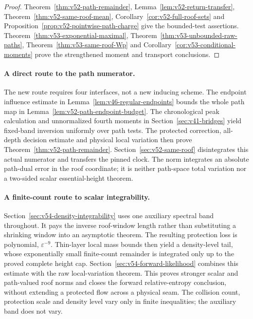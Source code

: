 \documentclass[11pt,reqno]{amsart}
\numberwithin{equation}{section}
\theoremstyle{definition}\newtheorem{definition}[theorem]{Definition}
\theoremstyle{remark}\newtheorem{remark}[theorem]{Remark}
\begin{document}
\begin{proof}
Theorem~\ref{thm:v52-path-remainder}, Lemma~\ref{lem:v52-return-transfer},
Theorem~\ref{thm:v52-same-roof-mean},
Corollary~\ref{cor:v52-full-roof-sets} and
Proposition~\ref{prop:v52-pointwise-path-charge} give the bounded-test
assertions. Theorem~\ref{thm:v53-exponential-maximal},
Theorem~\ref{thm:v53-unbounded-raw-paths},
Theorem~\ref{thm:v53-same-roof-Wp} and
Corollary~\ref{cor:v53-conditional-moments} prove the strengthened
moment and transport conclusions.
\end{proof}

\paragraph{A direct route to the path numerator.}
The new route requires four interfaces, not a new inducing scheme.
The endpoint influence estimate in
Lemma~\ref{lem:v46-regular-endpoints} bounds the whole path map in
Lemma~\ref{lem:v52-path-endpoint-budget}. The chronological peak
calculation and unnormalized fourth moments in
Section~\ref{sec:v41-bridges} yield fixed-band inversion uniformly over
path tests. The protected correction, all-depth decision estimate and
physical local variation then prove
Theorem~\ref{thm:v52-path-remainder}. Section~\ref{sec:v52-same-roof}
disintegrates this actual numerator and transfers the pinned clock.
The norm integrates an absolute path-dual error in the roof coordinate;
it is neither path-space total variation nor a two-sided scalar
essential-height theorem.

\paragraph{A finite-count route to scalar integrability.}
Section~\ref{sec:v54-density-integrability} uses one auxiliary spectral
band throughout. It pays the inverse roof-window length rather than
substituting a shrinking window into an asymptotic theorem. The
resulting protection loss is polynomial, $\varepsilon^{-9}$. Thin-layer
local mass bounds then yield a density-level tail, whose exponentially
small finite-count remainder is integrated only up to the proved
complete height cap. Section~\ref{sec:v54-forward-likelihood} combines
this estimate with the raw local-variation theorem. This proves stronger
scalar and path-valued roof norms and closes the forward relative-entropy
conclusion, without extending a protected flow across a physical seam.
The collision count, protection scale and density level vary only in
finite inequalities; the auxiliary band does not vary.
\end{document}
